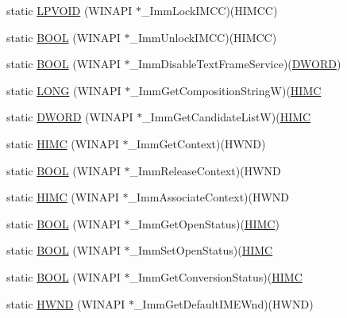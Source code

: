 \begin{DoxyCompactItemize}
\item 
static \hyperlink{class_c_d_x_u_t_i_m_e_edit_box_a09d09ca5bffb9f421c9c97858105586b}{LPVOID} (WINAPI $\ast$\_\-ImmLockIMCC)(HIMCC)
\item 
static \hyperlink{class_c_d_x_u_t_i_m_e_edit_box_a371801e557ba4ff1b753b33c1229574f}{BOOL} (WINAPI $\ast$\_\-ImmUnlockIMCC)(HIMCC)
\item 
static \hyperlink{class_c_d_x_u_t_i_m_e_edit_box_afcf48d94d78c8b2c71af2019c635f0fc}{BOOL} (WINAPI $\ast$\_\-ImmDisableTextFrameService)(\hyperlink{class_c_d_x_u_t_i_m_e_edit_box_a4666fce9b285d692ceb0515bf2dbde90}{DWORD})
\item 
static \hyperlink{class_c_d_x_u_t_i_m_e_edit_box_a5ea3424861783fb93d639481681ee338}{LONG} (WINAPI $\ast$\_\-ImmGetCompositionStringW)(\hyperlink{class_c_d_x_u_t_i_m_e_edit_box_aa9afdec726ecd526e2a0abc01537426c}{HIMC}
\item 
static \hyperlink{class_c_d_x_u_t_i_m_e_edit_box_a6e59c0aeb1b6cd02eb08437d5996a1c0}{DWORD} (WINAPI $\ast$\_\-ImmGetCandidateListW)(\hyperlink{class_c_d_x_u_t_i_m_e_edit_box_aa9afdec726ecd526e2a0abc01537426c}{HIMC}
\item 
static \hyperlink{class_c_d_x_u_t_i_m_e_edit_box_a0811d012d7ddb5d3384cdea1beb5aa68}{HIMC} (WINAPI $\ast$\_\-ImmGetContext)(HWND)
\item 
static \hyperlink{class_c_d_x_u_t_i_m_e_edit_box_ab1828ba67744482b0aec50deb5f9ddaf}{BOOL} (WINAPI $\ast$\_\-ImmReleaseContext)(HWND
\item 
static \hyperlink{class_c_d_x_u_t_i_m_e_edit_box_a933f71681cd58fae53c1ee3cb04d5484}{HIMC} (WINAPI $\ast$\_\-ImmAssociateContext)(HWND
\item 
static \hyperlink{class_c_d_x_u_t_i_m_e_edit_box_a5041919da19236ee4c67984b6f784789}{BOOL} (WINAPI $\ast$\_\-ImmGetOpenStatus)(\hyperlink{class_c_d_x_u_t_i_m_e_edit_box_aa9afdec726ecd526e2a0abc01537426c}{HIMC})
\item 
static \hyperlink{class_c_d_x_u_t_i_m_e_edit_box_abf576cfdcf09229db4caefc448285a7e}{BOOL} (WINAPI $\ast$\_\-ImmSetOpenStatus)(\hyperlink{class_c_d_x_u_t_i_m_e_edit_box_aa9afdec726ecd526e2a0abc01537426c}{HIMC}
\item 
static \hyperlink{class_c_d_x_u_t_i_m_e_edit_box_a3ba80e837a90d59f621fdd1bbca61a98}{BOOL} (WINAPI $\ast$\_\-ImmGetConversionStatus)(\hyperlink{class_c_d_x_u_t_i_m_e_edit_box_aa9afdec726ecd526e2a0abc01537426c}{HIMC}
\item 
static \hyperlink{class_c_d_x_u_t_i_m_e_edit_box_a383dbe71ad7fe88f3a4b2e6bfd588ca4}{HWND} (WINAPI $\ast$\_\-ImmGetDefaultIMEWnd)(HWND)

\end{DoxyCompactItemize}
